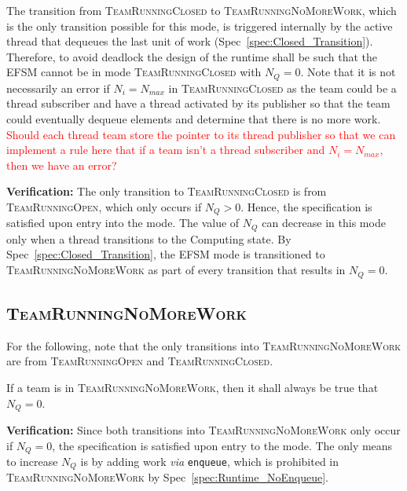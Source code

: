 \documentclass{article}
\newcommand{\TeamRunningOpen}   {\textsc{TeamRunningOpen}}
\newcommand{\TeamRunningClosed} {\textsc{TeamRunningClosed}}
\newcommand{\TeamRunningNoMoreWork} {\textsc{TeamRunningNoMoreWork}}
\begin{document}
\begin{spec}
\label{spec:Closed_NoWork}
The transition from {\TeamRunningClosed} to \TeamRunningNoMoreWork, which is the
only transition possible for this mode, is triggered internally by the active
thread that dequeues the last unit of work (Spec~\ref{spec:Closed_Transition}).
Therefore, to avoid deadlock the design of the runtime shall be such that the
EFSM cannot be in mode {\TeamRunningClosed} with $N_Q = 0$.  Note that it is not
necessarily an error if $N_i = N_{max}$ in {\TeamRunningClosed} as the team
could be a thread subscriber and have a thread activated by its publisher so
that the team could eventually dequeue elements and determine that there is no
more work.
\textcolor{red}{Should each thread team store the pointer to its thread
publisher so that we can implement a rule here that if a team isn't a thread
subscriber and $N_i = N_{max}$, then we have an error?}
\end{spec}
\textbf{Verification:}\hspace{0.125in}  The only transition to
{\TeamRunningClosed} is from {\TeamRunningOpen}, which only occurs if $N_Q > 0$.
Hence, the specification is satisfied upon entry into the mode.  The value of
$N_Q$ can decrease in this mode only when a thread transitions to the Computing
state.   By Spec~\ref{spec:Closed_Transition}, the EFSM mode is transitioned to
{\TeamRunningNoMoreWork} as part of every transition that results in $N_Q = 0$.

\subsection{\TeamRunningNoMoreWork}
For the following, note that the only transitions into {\TeamRunningNoMoreWork}
are from {\TeamRunningOpen} and \TeamRunningClosed.

\begin{spec}
\label{spec:NoMoreWork_NoWork}
If a team is in \TeamRunningNoMoreWork, then it shall always be true that $N_Q =
0$.
\end{spec}
\textbf{Verification:}\hspace{0.125in}  
Since both transitions into {\TeamRunningNoMoreWork} only occur if $N_Q = 0$,
the specification is satisfied upon entry to the mode.  The only means to
increase $N_Q$ is by adding work \textit{via} \texttt{enqueue}, which is
prohibited in {\TeamRunningNoMoreWork} by Spec~\ref{spec:Runtime_NoEnqueue}.
\end{document}
